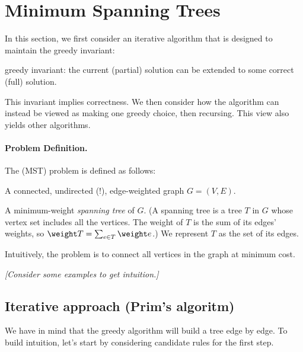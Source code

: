 
\section{Minimum Spanning Trees}\label{greedy: sec: MST}

In this section, we first consider an iterative algorithm
that is designed to maintain the greedy invariant:

\medskip 
\centerline{\textsf{greedy invariant}: the current (partial) solution can be extended to some correct (full) solution.}
\medskip 

This invariant implies correctness.
We then consider how the algorithm can instead be viewed as
making one greedy choice, then recursing.
This view also yields other algorithms.

\paragraph{Problem Definition.}

The  (MST) problem is defined as follows:

\begin{mylist}
\item[\bf input:] A connected, undirected (!), edge-weighted graph $G=(V,E)$.
\item[\bf output:] A minimum-weight \emph{spanning tree} of $G$.
  (A spanning tree is a tree $T$ in $G$ whose vertex set includes all the vertices.
  The weight of $T$ is the sum of its edges' weights,
  so $\weight T = \sum_{e\in T} \weight e$.)
  We represent $T$ as the set of its edges.
\end{mylist}
Intuitively, the problem is to connect all vertices in the graph at minimum cost.

\emph{[Consider some examples to get intuition.]}

\subsection{Iterative approach (Prim's algoritm)}\label{greedy: sec: prims}
We have in mind that the greedy algorithm will build a tree edge by edge.
To build intuition,
let's start by considering candidate rules for the first step.

